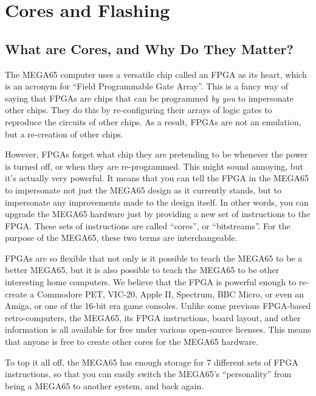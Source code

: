 \chapter{Cores and Flashing}
\label{cha:cores}

\section{What are Cores, and Why Do They Matter?}

The MEGA65 computer uses a versatile chip called an FPGA as its heart, which is
an acronym for ``Field Programmable Gate Array''. This is a fancy way of
saying that FPGAs are chips that can be programmed {\it by you} to impersonate
other chips. They do this by re-configuring their arrays of logic gates to
reproduce the circuits of other chips. As a result, FPGAs are not an emulation,
but a re-creation of other chips.

However, FPGAs forget what chip they are pretending
to be whenever the power is turned off, or when they are re-programmed.
This might sound annoying, but it's actually very powerful. It means that
you can tell the FPGA in the MEGA65 to impersonate not just the MEGA65 design
as it currently stands, but to impersonate any improvements made to the design itself.
In other words, you can upgrade the MEGA65 hardware just by providing a new
set of instructions to the FPGA.  These sets of instructions are called ``cores'',
or ``bitstreams''. For the purpose of the MEGA65, these two terms are interchangeable.

FPGAs are so flexible that not only is it possible to teach the MEGA65 to be a better
MEGA65, but it is also possible to teach the MEGA65 to be other interesting
home computers. We believe that the FPGA is powerful enough to re-create
a Commodore PET\texttrademark, VIC-20\texttrademark, Apple II\texttrademark, Spectrum\texttrademark,
BBC Micro\texttrademark, or even an Amiga\texttrademark, or one of the 16-bit era game consoles. Unlike some
previous FPGA-based retro-computers, the MEGA65, its FPGA instructions, board layout, and other information is
all available for free under various open-source licenses. This means that anyone is free to
create other cores for the MEGA65 hardware.

To top it all off, the MEGA65 has enough storage for 7 different sets of FPGA instructions,
so that you can easily switch the MEGA65's ``personality'' from being a MEGA65 to another
system, and back again.

